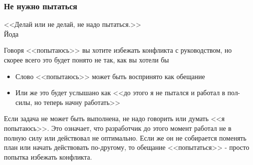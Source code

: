 \documentclass{../industrial-development}
\begin{document}
\begin{frame} \frametitle{Не нужно пытаться}
\begin{flushright}
<<Делай или не делай, не надо пытаться.>>\\
Йода
\end{flushright}
  Говоря <<попытаюсь>> вы хотите избежать конфликта с руководством, но скорее всего это будет понято не так, как вы хотели бы
		\begin{itemize}
		\item Слово <<попытаюсь>> может быть воспринято как обещание
		\item Или же это будет услышано как <<до этого я не пытался и работал в пол-силы, но теперь начну работать>>
		\end{itemize}
\end{frame}
\lecturenotes
Если задача не может быть выполнена, не надо говорить или думать <<я попытаюсь>>.
Это означает, что разработчик до этого момент работал не в полную силу или действовал не оптимально.
Если же он не собирается поменять план или начать действовать по-другому, то обещание <<попытаться>> - просто попытка избежать конфликта.
\end{document}
